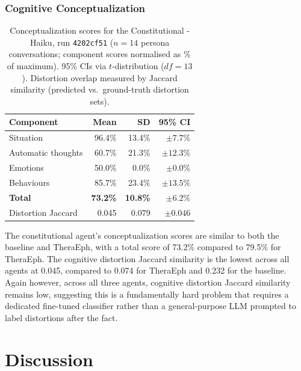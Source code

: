 \documentclass[twoside]{report}
\begin{document}
\subsection{Cognitive Conceptualization}

\begin{table}[ht]
\centering
\caption{Conceptualization scores for the Constitutional - Haiku, run \texttt{4202cf51} ($n = 14$ persona conversations; component scores normalised as \% of maximum). 95\% CIs via $t$-distribution ($df = 13$). Distortion overlap measured by Jaccard similarity (predicted vs.\ ground-truth distortion sets).}
\label{tab:concept_4202cf51}
\begin{tabular}{|l|r|r|r|}
\hline
\textbf{Component} & \textbf{Mean} & \textbf{SD} & \textbf{95\% CI} \\
\hline
\hline
Situation & 96.4\% & 13.4\% & $\pm 7.7\%$ \\
\hline
Automatic thoughts & 60.7\% & 21.3\% & $\pm 12.3\%$ \\
\hline
Emotions & 50.0\% & 0.0\% & $\pm 0.0\%$ \\
\hline
Behaviours & 85.7\% & 23.4\% & $\pm 13.5\%$ \\
\hline
\hline
\textbf{Total} & \textbf{73.2\%} & \textbf{10.8\%} & $\mathbf{\pm 6.2\%}$ \\
\hline
\hline
Distortion Jaccard & 0.045 & 0.079 & $\pm 0.046$ \\
\hline
\end{tabular}
\end{table}
\FloatBarrier

The constitutional agent's conceptualization scores are similar to both the baseline and TheraEph, with a total score of 73.2\% compared to 79.5\% for TheraEph. The cognitive distortion Jaccard similarity is the lowest across all agents at 0.045, compared to 0.074 for TheraEph and 0.232 for the baseline. Again however,  across all three agents, cognitive distortion Jaccard similarity remains low, suggesting this is a fundamentally hard problem that requires a dedicated fine-tuned classifier rather than a general-purpose LLM prompted to label distortions after the fact.

\chapter{Discussion}
\end{document}
